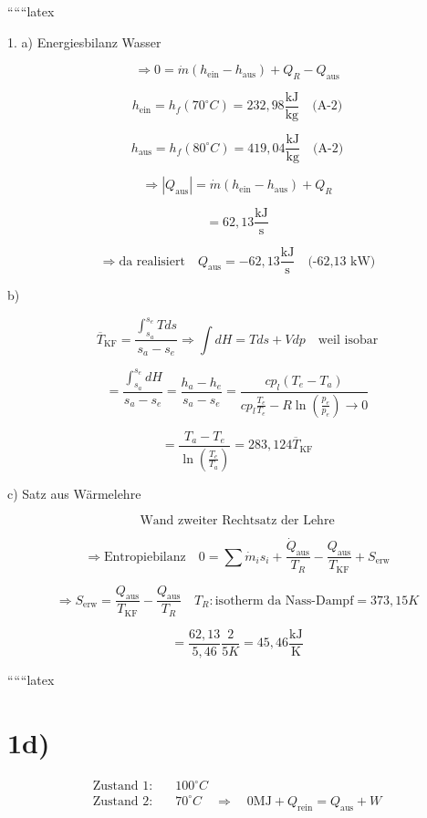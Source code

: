
``````latex


1. a) Energiesbilanz Wasser

\[
\Rightarrow 0 = \dot{m} (h_{\text{ein}} - h_{\text{aus}}) + Q_R - Q_{\text{aus}}
\]

\[
h_{\text{ein}} = h_f(70^\circ C) = 232,98 \frac{\text{kJ}}{\text{kg}} \quad \text{(A-2)}
\]

\[
h_{\text{aus}} = h_f(80^\circ C) = 419,04 \frac{\text{kJ}}{\text{kg}} \quad \text{(A-2)}
\]

\[
\Rightarrow |Q_{\text{aus}}| = \dot{m} (h_{\text{ein}} - h_{\text{aus}}) + Q_R
\]

\[
= 62,13 \frac{\text{kJ}}{\text{s}}
\]

\[
\Rightarrow \text{da realisiert} \quad Q_{\text{aus}} = -62,13 \frac{\text{kJ}}{\text{s}} \quad \text{(-62,13 kW)}
\]

b)

\[
\overline{T}_{\text{KF}} = \frac{\int_{s_a}^{s_e} T ds}{s_a - s_e} \Rightarrow \int dH = T ds + V dp \quad \text{weil isobar}
\]

\[
= \frac{\int_{s_a}^{s_e} dH}{s_a - s_e} = \frac{h_a - h_e}{s_a - s_e} = \frac{cp_l (T_e - T_a)}{cp_l \frac{T_e}{T_e} - R \ln \left( \frac{p_e}{p_e} \right) \rightarrow 0}
\]

\[
= \frac{T_a - T_e}{\ln \left( \frac{T_e}{T_a} \right)} = 283,124 \overline{T}_{\text{KF}}
\]

c) Satz aus Wärmelehre

\[
\text{Wand zweiter Rechtsatz der Lehre}
\]

\[
\Rightarrow \text{Entropiebilanz} \quad 0 = \sum \dot{m}_i s_i + \frac{\dot{Q}_{\text{aus}}}{T_R} - \frac{Q_{\text{aus}}}{T_{\text{KF}}} + S_{\text{erw}}
\]

\[
\Rightarrow S_{\text{erw}} = \frac{Q_{\text{aus}}}{T_{\text{KF}}} - \frac{Q_{\text{aus}}}{T_R} \quad T_R: \text{isotherm da Nass-Dampf} = 373,15 K
\]

\[
= \frac{62,13}{5,46} \frac{2}{5 K} = 45,46 \frac{\text{kJ}}{\text{K}}
\]

``````latex


\section*{1d)}

\begin{align*}
\text{Zustand 1:} & \quad 100^\circ C \\
\text{Zustand 2:} & \quad 70^\circ C \quad \Rightarrow \quad 0 \text{MJ} + Q_{\text{rein}} = Q_{\text{aus}} + W
\end{align*}

